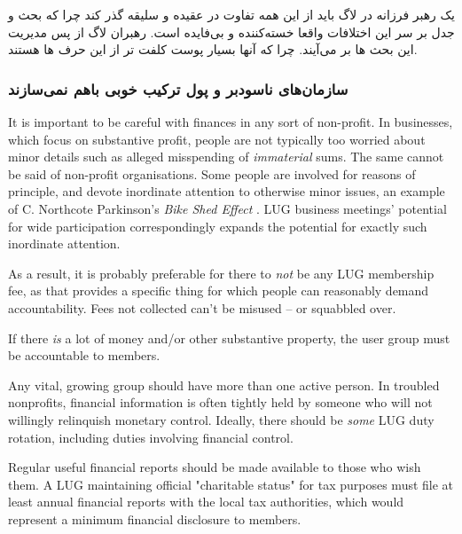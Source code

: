 یک رهبر فرزانه در لاگ باید از این همه تفاوت در عقیده و سلیقه گذر کند چرا که بحث و جدل
بر سر این اختلافات واقعا خسته‌کننده و بی‌فایده است. رهبران لاگ از پس مدیریت این بحث ها 
بر می‌آیند. چرا که آنها بسیار پوست کلفت تر از این حرف ها هستند.

\subsubsection{سازمان‌های ناسودبر و پول ترکیب خوبی باهم نمی‌سازند}

It is important to be careful with finances in any sort of non-profit.
In businesses, which focus on substantive profit, people are not
typically too worried about minor details such as alleged misspending of
{\itshape immaterial\/} sums.  The same cannot be said of non-profit
organisations.  Some people are involved for reasons of principle, and
devote inordinate attention to otherwise minor issues, an example of C.
Northcote Parkinson's 
\emph{Bike Shed Effect} \texttt{\aeturl}
. LUG business
meetings' potential for wide participation correspondingly expands the
potential for exactly such inordinate attention.

As a result, it is probably preferable for there to {\itshape not\/} be any
LUG membership fee, as that provides a specific thing for which people
can reasonably demand accountability.  Fees not collected can't be
misused -- or squabbled over.

If there {\itshape is\/} a lot of money and/or other substantive property,
the user group must be accountable to members.

Any vital, growing group should have more than one active person.  In
troubled nonprofits, financial information is often tightly held by
someone who will not willingly relinquish monetary control. Ideally,
there should be {\itshape some\/} LUG duty rotation, including duties
involving financial control.

Regular useful financial reports should be made available to those
who wish them. A LUG maintaining official "charitable status"
for tax purposes must file at least annual financial reports
with the local tax authorities, which would represent a minimum
financial disclosure to members.

